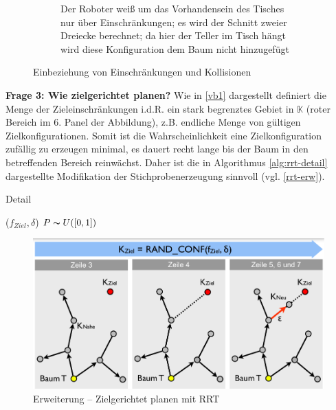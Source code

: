 \begin{figure}[h!]
\begin{subfigure}{.5\textwidth}
		\caption{Der Roboter \glqq weiß\grqq{} um das Vorhandensein des Tisches nur über Einschränkungen; es wird der Schnitt zweier Dreiecke berechnet; da hier der Teller im Tisch hängt wird diese Konfiguration dem Baum nicht hinzugefügt}
	\end{subfigure}
	\caption{Einbeziehung von Einschränkungen und Kollisionen}
	\label{fig:einschr}
\end{figure}
\textbf{Frage 3: Wie zielgerichtet planen?}
Wie in \autoref{vb1} dargestellt definiert die Menge der Zieleinschränkungen i.d.R. ein stark begrenztes Gebiet in $\mathbb{K}$ (roter Bereich im 6. Panel der Abbildung), z.B. endliche Menge von gültigen Zielkonfigurationen. Somit ist die Wahrscheinlichkeit eine Zielkonfiguration zufällig zu erzeugen minimal, es dauert recht lange bis der Baum in den betreffenden Bereich reinwächst.
Daher ist die in Algorithmus \autoref{alg:rrt-detail} dargestellte Modifikation der Stichprobenerzeugung sinnvoll (vgl. \autoref{rrt-erw}).\\
\begin{algorithm}
  \caption{Detail
    \label{alg:rrt-detail}}
  \begin{algorithmic}[1]
    ($f_{Ziel}, \delta$) 
      \State $P \thicksim U(\left[0,1\right])$
      	\State {}
      \Else
      	\State {}
      \EndIf
  \end{algorithmic}
\end{algorithm}
\begin{figure}[h!]
	\centering
	\includegraphics[width=.5\textwidth]{figures/ch04_rrt-erw.png}
	\caption{Erweiterung -- Zielgerichtet planen mit RRT}
	\label{rrt-erw}
\end{figure}
